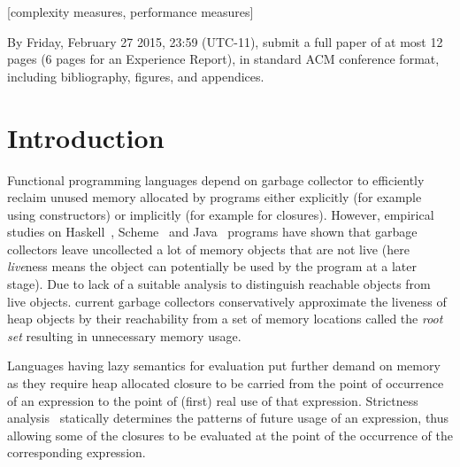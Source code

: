 \documentclass{sig-alternate}
\begin{document}
[complexity  measures,
  performance measures]



By Friday, February 27 2015, 23:59 (UTC-11), submit a full paper of at
most  12 pages (6  pages for  an Experience  Report), in  standard ACM
conference format, including bibliography, figures, and appendices.

\section{Introduction}
\label{sec:intro}

Functional  programming  languages  depend  on  garbage  collector  to
efficiently  reclaim  unused  memory   allocated  by  programs  either
explicitly (for example using constructors) or implicitly (for example
for      closures).       However,      empirical      studies      on
Haskell~\cite{rojemo96lag},  Scheme~\cite{karkare06effectiveness}  and
Java~\cite{shaham02estimating}  programs   have  shown   that  garbage
collectors leave uncollected a lot of memory objects that are not live
(here {\em live}ness  means the object can potentially be  used by the
program at  a later  stage).  Due  to lack of  a suitable  analysis to
distinguish  reachable  objects  from live  objects.  current  garbage
collectors conservatively approximate the  liveness of heap objects by
their reachability from a set of memory locations called the {\em root
  set\/} resulting in unnecessary memory usage.

Languages having lazy  semantics for evaluation put  further demand on
memory as they  require heap allocated closure to be  carried from the
point of occurrence  of an expression to the point  of (first) real use
of  that expression.  Strictness analysis~\cite{some-refs}  statically
determines  the  patterns  of  future usage  of  an  expression,  thus
allowing some  of the  closures to  be evaluated at  the point  of the
occurrence of the corresponding expression.
\newcommand{\nilfigure}
{\scalebox{0.75}{
\psset{unit=1mm,nodesep=0mm,labelsep=0.5mm}
\begin{pspicture}(0,0)(1,1)
\putnode{start}{origin}{0}{0}{}
\putnode{stop}{origin}{10}{10}{}
\ncline[offsetB=0,nodesepB=0,linewidth=.7]{-}{start}{stop} %
\end{pspicture}
}}
\end{document}
